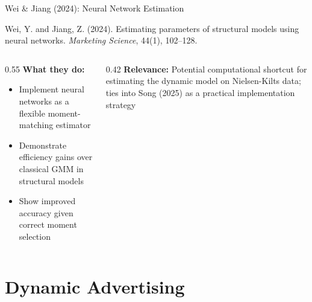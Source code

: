 \documentclass[aspectratio=169,professionalfonts]{beamer}
\newcommand{\hl}[1]{\textbf{\textcolor{UGARed}{#1}}}
\begin{document}
\begin{frame}{Wei \& Jiang (2024): Neural Network Estimation}
  \begin{tcolorbox}[colback=red!5!white, colframe=UGARed, title=\textbf{Citation}]
    Wei, Y. and Jiang, Z. (2024). Estimating parameters of structural models using
    neural networks. \textit{Marketing Science}, 44(1), 102--128.
  \end{tcolorbox}
  \vspace{6pt}
  \begin{columns}[T]
    \begin{column}{0.55\textwidth}
      \hl{What they do:}
      \begin{itemize}
        \item Implement neural networks as a flexible moment-matching estimator
        \item Demonstrate efficiency gains over classical GMM in structural models
        \item Show improved accuracy given correct moment selection
      \end{itemize}
    \end{column}
    \begin{column}{0.42\textwidth}
      \hl{Relevance:} Potential computational shortcut for estimating the dynamic model
      on Nielsen-Kilts data; ties into Song (2025) as a practical implementation strategy
    \end{column}
  \end{columns}
\end{frame}

\section{Dynamic Advertising}
\end{document}
